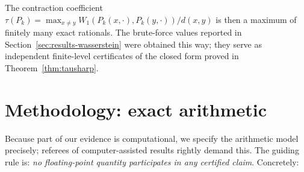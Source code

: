 \documentclass[11pt]{amsart}
\theoremstyle{definition}
\theoremstyle{remark}
\newcommand{\dW}{W_1}
\begin{document}
The contraction coefficient $\tau(P_k) = \max_{x \neq y} \dW(P_k(x,\cdot), P_k(y,\cdot))/d(x,y)$ is then a maximum of finitely many exact rationals. The brute-force values reported in Section~\ref{sec:results-wasserstein} were obtained this way; they serve as independent finite-level certificates of the closed form proved in Theorem~\ref{thm:tausharp}.

\section{Methodology: exact arithmetic}\label{sec:methodology}

Because part of our evidence is computational, we specify the arithmetic model precisely; referees of computer-assisted results rightly demand this. The guiding rule is: \emph{no floating-point quantity participates in any certified claim}. Concretely:
\end{document}
